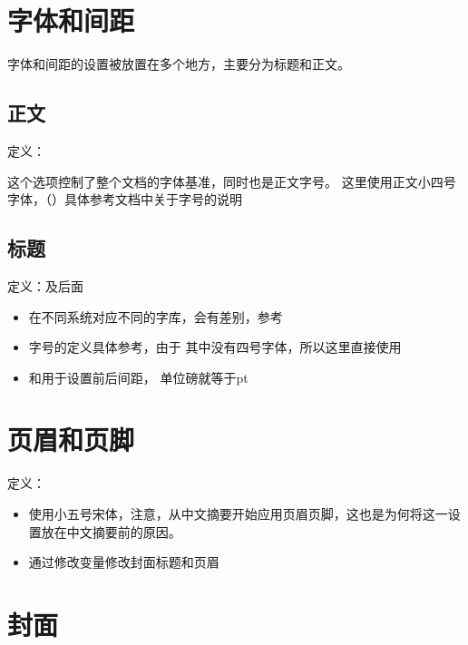 \section{字体和间距}

字体和间距的设置被放置在多个地方，主要分为标题和正文。

\subsection{正文}

定义：

\ilcode{\zihao}这个选项控制了整个文档的字体基准，同时也是正文字号。
这里使用正文小四号字体，（）具体参考\CTeXlogo 文档中关于字号的说明


\subsection{标题}
定义：及后面

\begin{itemize}
    \item \ilcode{\songti}在不同系统对应不同的字库，会有差别，参考\CTeXlogo
    \item 字号的定义具体参考\CTeXlogo，由于 其中没有四号字体，所以这里直接使用\ilcode{\zihao}
    \item \ilcode{\beforeskip}和\ilcode{\aftereskip}用于设置前后间距，
            单位磅就等于pt
\end{itemize}

\section{页眉和页脚}

定义：

\begin{itemize}
    \item 使用小五号宋体，注意，从中文摘要开始应用页眉页脚，这也是为何将这一设置放在中文摘要前的原因。
    \item 通过修改变量\ilcode{\def\NJUST@value@pageDegree}\redstar 修改封面标题和页眉
\end{itemize}

\section{封面}


